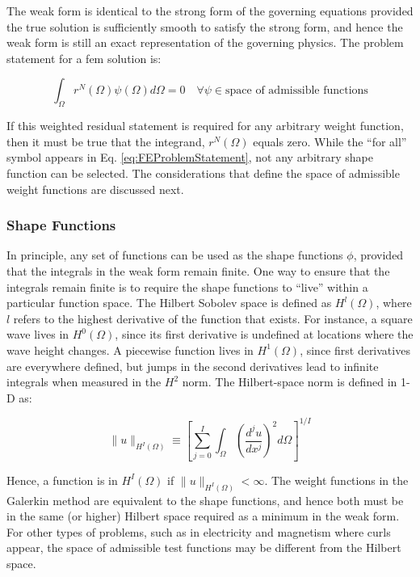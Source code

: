 \documentclass[10pt]{article}
\numberwithin{equation}{section} %
\begin{document}
The weak form is identical to the strong form of the governing equations provided the true solution is sufficiently smooth to satisfy the strong form, and hence the weak form is still an exact representation of the governing physics. The problem statement for a \gls{fem} solution is:

\begin{equation}
\label{eq:FEProblemStatement}
\int_{\Omega}r^N(\Omega)\psi(\Omega)d\Omega=0\quad\forall\psi\in \text{space of admissible functions}
\end{equation}

If this weighted residual statement is required for any arbitrary weight function, then it must be true that the integrand, \(r^N(\Omega)\) equals zero. While the ``for all'' symbol appears in Eq. \eqref{eq:FEProblemStatement}, not any arbitrary shape function can be selected. The considerations that define the space of admissible weight functions are discussed next.

\subsubsection{Shape Functions}

In principle, any set of functions can be used as the shape functions \(\phi\), provided that the integrals in the weak form remain finite. One way to ensure that the integrals remain finite is to require the shape functions to ``live'' within a particular function space. The Hilbert Sobolev space is defined as \(H^l(\Omega)\), where \(l\) refers to the highest derivative of the function that exists. For instance, a square wave lives in \(H^0(\Omega)\), since its first derivative is undefined at locations where the wave height changes. A piecewise function lives in \(H^1(\Omega)\), since first derivatives are everywhere defined, but jumps in the second derivatives lead to infinite integrals when measured in the \(H^2\) norm. The Hilbert-space norm is defined in 1-D as:

\begin{equation}
\|u\|_{H^I(\Omega)}\equiv\left\lbrack\sum_{j=0}^{I}\int_{\Omega}\left(\frac{d^ju}{dx^j}\right)^2d\Omega\right\rbrack^{1/I}
\end{equation}

Hence, a function is in \(H^I(\Omega)\) if \(\|u\|_{H^I(\Omega)}<\infty\). The weight functions in the Galerkin method are equivalent to the shape functions, and hence both must be in the same (or higher) Hilbert space required as a minimum in the weak form. For other types of problems, such as in electricity and magnetism where curls appear, the space of admissible test functions may be different from the Hilbert space. 
\end{document}
